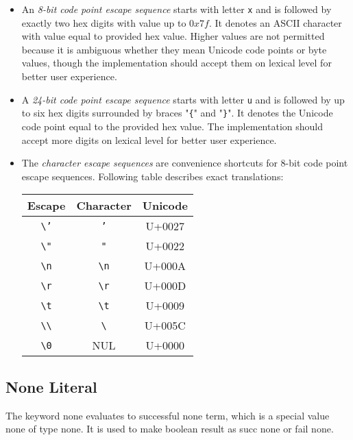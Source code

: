 \begin{itemize}
  \item An \emph{8-bit code point escape sequence} starts with letter \texttt{x} and is followed by exactly two hex digits with value up to \(0x7f\). It denotes an ASCII character with value equal to provided hex value. Higher values are not permitted because it is ambiguous whether they mean Unicode code points or byte values, though the implementation should accept them on lexical level for better user experience.
  \item A \emph{24-bit code point escape sequence} starts with letter \texttt{u} and is followed by up to six hex digits surrounded by braces "\texttt{\{}" and "\texttt{\}}". It denotes the Unicode code point equal to the provided hex value. The implementation should accept more digits on lexical level for better user experience.
  \item The \emph{character escape sequences} are convenience shortcuts for 8-bit code point escape sequences. Following table describes exact translations:

    \begin{center}
    \begin{tabular}{c|c|c}
      Escape & Character & Unicode \\
      \hline
      \texttt{\textbackslash '} & \texttt{'} & U+0027 \\
      \texttt{\textbackslash "} & \texttt{"} & U+0022 \\
      \texttt{\textbackslash n} & \texttt{\textbackslash n} & U+000A \\
      \texttt{\textbackslash r} & \texttt{\textbackslash r} & U+000D \\
      \texttt{\textbackslash t} & \texttt{\textbackslash t} & U+0009 \\
      \texttt{\textbackslash \textbackslash} & \texttt{\textbackslash} & U+005C \\
      \texttt{\textbackslash 0} & NUL & U+0000 \\
    \end{tabular}
    \end{center}
\end{itemize}

\subsection{None Literal}

The keyword none evaluates to successful none term, which is a special value none of type none. It is used to make boolean result as succ none or fail none.